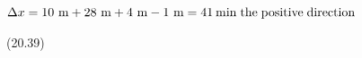 {\begin{mdframed}[linewidth=4, leftmargin=40, rightmargin=40]
\begin{exercise}
\begin{enumerate}[noitemsep, label=\textbf{Step} \textbf{\arabic*}. ]
{\begin{equation}
      \end{equation}
    }{%
    \setlength{\mymathboxwidth}{\columnwidth}
      \addtolength{\mymathboxwidth}{-48pt}
    \par\vspace{12pt}\noindent\begin{minipage}{\columnwidth}
    \parbox[t]{\mymathboxwidth}{\large\begin{math}
    \Delta x=10\phantom{\rule{3.33333pt}{0ex}}\mathrm{m}+28\phantom{\rule{3.33333pt}{0ex}}\mathrm{m}+4\phantom{\rule{3.33333pt}{0ex}}\mathrm{m}-1\phantom{\rule{3.33333pt}{0ex}}\mathrm{m}=41\phantom{\rule{2pt}{0ex}}\mathrm{m}\mathrm{in\; the\; positive\; direction}\end{math}}\hfill
    \parbox[t]{48pt}{\raggedleft 
    (20.39)}
    \end{minipage}\vspace{12pt}\par
    }%
    
      
      
      \end{enumerate}
         

    \end{exercise}
    \end{mdframed}
    }
    \noindent
  
\par
            \label{m38795*secfhsst!!!underscore!!!id3645}\vspace{.5cm} 
      
